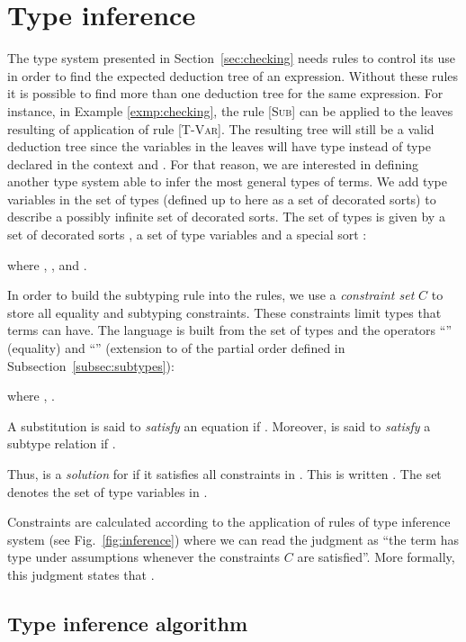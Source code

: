 \documentclass{eptcs}
\newcommand{\CC}{\ensuremath{C}\xspace}
\newcommand{\TVar}{{\small \textsc{T-Var}}}
\newcommand{\Sub}{{\small \textsc{Sub}}}
\begin{document}
\section{Type inference}
\label{sec:inference}

The type system presented in Section~\ref{sec:checking} needs rules to
control its use in order to find the expected deduction tree of an expression. Without these rules it is possible to find more than one
deduction tree for the same expression. For instance, in Example
\ref{exmp:checking}, the rule [\Sub] can be applied to the leaves resulting of application of
rule [\TVar]. The resulting tree will still be a valid deduction tree since the
variables in the leaves will have type  instead of type 
declared in the context and . For that reason, we are interested in defining another type system
able to infer the most general types of terms. We add type variables in the set
of types (defined up to here as a set of decorated sorts) to describe a
possibly infinite set of decorated sorts. The set of types
 is given by a set of decorated sorts , a set of type variables
 and a special sort :

where , ,  and . 

In order to build the subtyping rule into the rules, we use a
{\em constraint set} \CC to store all equality and subtyping constraints. These
constraints limit types that terms can have. The language  is built from
the set of types  and the operators ``'' (equality) and
``'' (extension to  of the partial order defined in Subsection~\ref{subsec:subtypes}):

where , .

A substitution  is said to {\em satisfy} an equation 
if . Moreover,  is said
to {\em satisfy} a subtype relation  if .

Thus,  is a {\em solution} for  if
it satisfies all constraints in . This is written . The set  denotes the set of type
variables in . 

Constraints are calculated according to the application of rules of
 type inference system (see Fig.~\ref{fig:inference}) where we
can read the judgment  as ``the term  has type 
under assumptions  whenever the constraints \CC are
satisfied''. More formally, this judgment states that .

\subsection{Type inference algorithm}
\label{subsec:inference_algo}
\end{document}
